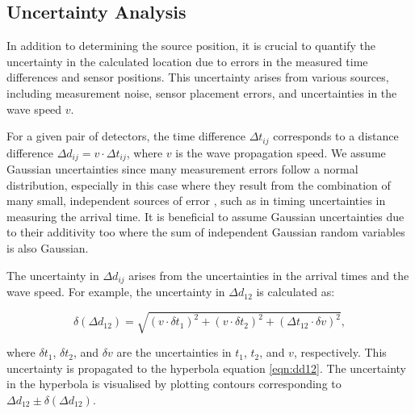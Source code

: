 \subsection{Uncertainty Analysis} 

In addition to determining the source position, it is crucial to quantify the uncertainty in the calculated location due to errors in the measured time differences and sensor positions. This uncertainty arises from various sources, including measurement noise, sensor placement errors, and uncertainties in the wave speed \( v \).

For a given pair of detectors, the time difference \(\Delta t_{ij}\) corresponds to a distance difference \(\Delta d_{ij} = v \cdot \Delta t_{ij}\), where \(v\) is the wave propagation speed. We assume Gaussian uncertainties since many measurement errors follow a normal distribution, especially in this case where they result from the combination of many small, independent sources of error \cite{enwiki:1251161789}, such as in timing uncertainties in measuring the arrival time. It is beneficial to assume Gaussian uncertainties due to their additivity too where the sum of independent Gaussian random variables is also Gaussian.

The uncertainty in \(\Delta d_{ij}\) arises from the uncertainties in the arrival times and the wave speed. For example, the uncertainty in \(\Delta d_{12}\) is calculated as:

\begin{equation}
\delta (\Delta d_{12}) = \sqrt{(v \cdot \delta t_1)^2 + (v \cdot \delta t_2)^2 + (\Delta t_{12} \cdot \delta v)^2},
\label{eqn:dd12-unc}
\end{equation}

where \(\delta t_1\), \(\delta t_2\), and \(\delta v\) are the uncertainties in \(t_1\), \(t_2\), and \(v\), respectively. This uncertainty is propagated to the hyperbola equation \ref{eqn:dd12}. The uncertainty in the hyperbola is visualised by plotting contours corresponding to \(\Delta d_{12} \pm \delta (\Delta d_{12})\).

\newpage


